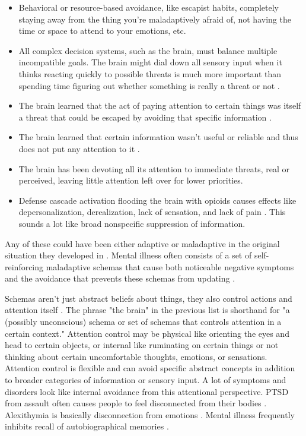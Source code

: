 \documentclass[12pt,letterpaper]{book}
\begin{document}
\begin{itemize}
    \item Behavioral or resource-based avoidance, like escapist habits, completely staying away from the thing you're maladaptively afraid of, not having the time or space to attend to your emotions, etc.
    \item All complex decision systems, such as the brain, must balance multiple incompatible goals. The brain might dial down all sensory input when it thinks reacting quickly to possible threats is much more important than spending time figuring out whether something is really a threat or not \cite{berghSelfEvidencing}.
    \item The brain learned that the act of paying attention to certain things was itself a threat that could be escaped by avoiding that specific information \cite{berghSelfEvidencing}.
    \item The brain learned that certain information wasn't useful or reliable and thus does not put any attention to it \cite{clark2015surfing}.
    \item The brain has been devoting all its attention to immediate threats, real or perceived, leaving little attention left over for lower priorities.
    \item Defense cascade activation flooding the brain with opioids causes effects like depersonalization, derealization, lack of sensation, and lack of pain \cite{kozlowskaDefenseCascade}. This sounds a lot like broad nonspecific suppression of information.
\end{itemize}
Any of these could have been either adaptive or maladaptive in the original situation they developed in \cite{clark2015surfing}. Mental illness often consists of a set of self-reinforcing maladaptive schemas that cause both noticeable negative symptoms and the avoidance that prevents these schemas from updating \cite{berghSelfEvidencing}.

Schemas aren't just abstract beliefs about things, they also control actions and attention itself \cite{clark2015surfing}. The phrase "the brain" in the previous list is shorthand for "a (possibly unconscious) schema or set of schemas that controls attention in a certain context." Attention control may be physical like orienting the eyes and head to certain objects, or internal like ruminating on certain things or not thinking about certain uncomfortable thoughts, emotions, or sensations. Attention control is flexible and can avoid specific abstract concepts in addition to broader categories of information or sensory input. A lot of symptoms and disorders look like internal avoidance from this attentional perspective. PTSD from assault often causes people to feel disconnected from their bodies \cite{vanderKolkBody}. Alexithymia is basically disconnection from emotions \cite{hogeveen2021alexithymia}. Mental illness frequently inhibits recall of autobiographical memories \cite{berghSelfEvidencing}.
\end{document}
